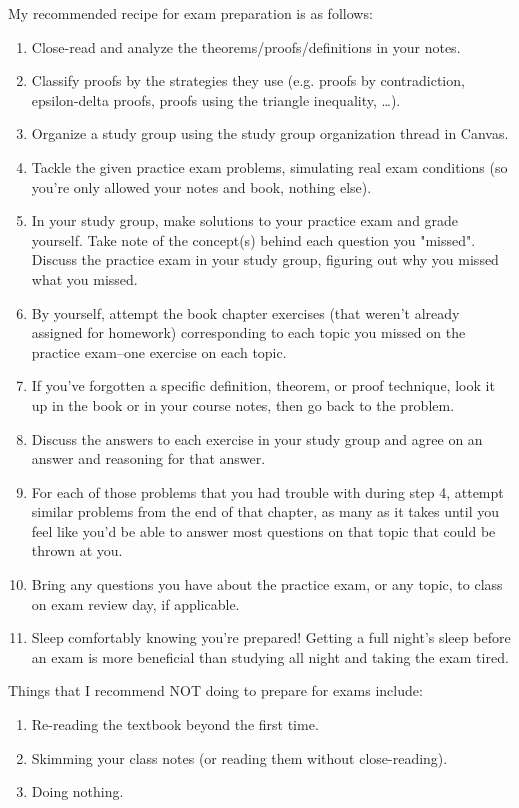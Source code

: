 \documentclass[11pt, a4paper]{article}
\begin{document}
My recommended recipe for exam preparation is as follows:

\begin{enumerate}
\item Close-read and analyze the theorems/proofs/definitions in your notes.
\item Classify proofs by the strategies they use (e.g. proofs by contradiction, epsilon-delta proofs, proofs using the triangle inequality, \dots).
\item Organize a study group using the study group organization thread in Canvas.
\item Tackle the given practice exam problems, simulating real exam conditions (so you're only allowed your notes and book, nothing else). 
\item In your study group, make solutions to your practice exam and grade yourself. Take note of the concept(s) behind each question you "missed". Discuss the practice exam in your study group, figuring out why you missed what you missed.
\item By yourself, attempt the book chapter exercises (that weren't already assigned for homework) corresponding to each topic you missed on the practice exam--one exercise on each topic. 
\item If you've forgotten a specific definition, theorem, or proof technique, look it up in the book or in your course notes, then go back to the problem.
\item Discuss the answers to each exercise in your study group and agree on an answer and reasoning for that answer.
\item For each of those problems that you had trouble with during step 4, attempt similar problems from the end of that chapter, as many as it takes until you feel like you'd be able to answer most questions on that topic that could be thrown at you.
\item Bring any questions you have about the practice exam, or any topic, to class on exam review day, if applicable. 
\item Sleep comfortably knowing you're prepared! Getting a full night's sleep before an exam is more beneficial than studying all night and taking the exam tired.

\end{enumerate}

Things that I recommend NOT doing to prepare for exams include:

\begin{enumerate}
\item Re-reading the textbook beyond the first time.
\item Skimming your class notes (or reading them without close-reading).
\item Doing nothing.
\end{enumerate}
\end{document}
